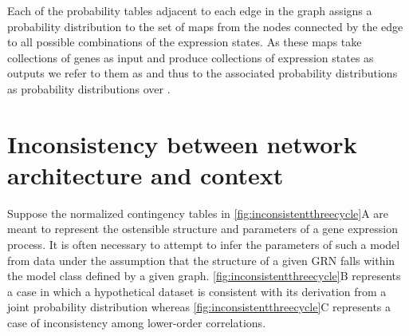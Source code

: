 Each of the probability tables adjacent to each edge in the graph assigns a probability distribution to the set of maps from the nodes connected by the edge to all possible combinations of the expression states. As these maps take collections of genes as input and produce collections of expression states as outputs we refer to them as \gnpm{} and thus to the associated probability distributions as probability distributions over \gnpm{}.

\section{Inconsistency between network architecture and context}
Suppose the normalized contingency tables in \ref{fig:inconsistentthreecycle}A are meant to represent the ostensible structure and parameters of a gene expression process. It is often necessary to attempt to infer the parameters of such a model from data under the assumption that the structure of a given GRN falls within the model class defined by a given graph. \ref{fig:inconsistentthreecycle}B represents a case in which a hypothetical dataset is consistent with its derivation from a joint probability distribution whereas \ref{fig:inconsistentthreecycle}C represents a case of inconsistency among lower-order correlations.
